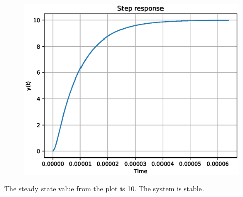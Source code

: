 \begin{enumerate}[label=\thesubsection.\arabic*.,ref=\thesubsection.\theenumi]
\begin{figure}[!ht]
\includegraphics[width=\columnwidth]{./figs/ee18btech11005/ee18btech11005_2.eps}
\caption{}
\label{fig:ee18btech11005_2}
\end{figure}
The steady state value from the plot is 10.
The system is stable.
\end{enumerate}

